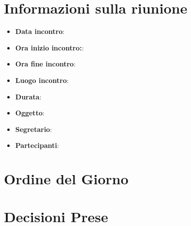 \section{Informazioni sulla riunione}
\begin{itemize}
	\item \textbf{Data incontro}: \data
	\item \textbf{Ora inizio incontro:}: \oraInizio
	\item \textbf{Ora fine incontro}: \oraFine
	\item \textbf{Luogo incontro}:\ \luogo
	\item \textbf{Durata}: \durata
	\item \textbf{Oggetto}: \oggetto
	\item \textbf{Segretario}: \segretario
	\item \textbf{Partecipanti}: \partecipanti
\end{itemize}
\section{Ordine del Giorno}
\ordineDelGiorno

\section{Decisioni Prese}
\contenuto
